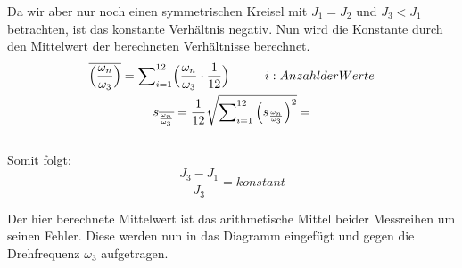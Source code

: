 Da wir aber nur noch einen symmetrischen Kreisel mit $J_1 = J_2$ und $J_3<J_1$ betrachten, ist das konstante Verh\"altnis  negativ. Nun wird die Konstante durch den Mittelwert der berechneten Verh\"altnisse berechnet.
\begin{gather}   
    \overline{\Bigl(\frac{\omega_n}{\omega_3}\Bigr)} = \sum\nolimits_{i=1}^{12}\Bigl(\frac{\omega_n}{\omega_3}\cdot{\frac{1}{12}}\Bigr) \tab i: Anzahl der Werte\\
    s_{\overline{\frac{\omega_n}{\omega_3}} }= \frac{1}{12}\sqrt{\sum\nolimits_{i=1}^{12}{\Bigl(s_{\frac{\omega_n}{\omega_3}}\Bigr)}^2}=
\end{gather} \\
Somit folgt: 
\begin{equation}
    \frac{J_3-J_1}{J_3}= konstant
\end{equation}

Der hier berechnete Mittelwert ist das arithmetische Mittel beider Messreihen um seinen Fehler. Diese werden nun in das Diagramm eingef\"ugt und gegen die Drehfrequenz $\omega_3$ aufgetragen. 
